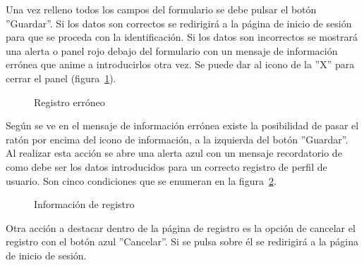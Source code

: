 \documentclass[a4paper, 12pt]{book}
\begin{document}
Una vez relleno todos los campos del formulario se debe pulsar el bot\'on ''Guardar''. Si los datos son correctos se redirigir\'a a la p\'agina de inicio
de sesi\'on para que se proceda con la identificaci\'on. Si los datos son incorrectos se mostrar\'a una alerta o panel rojo debajo del formulario con un 
mensaje de informaci\'on err\'onea que anime a introducirlos otra vez. Se puede dar al icono de la ''X'' para cerrar el panel 
(figura~\ref{figura:registro2}).
\begin{figure}[htbp] 
  \centering
  \caption{Registro err\'oneo}
  \label{figura:registro2}
\end{figure}

Seg\'un se ve en el mensaje de informaci\'on err\'onea existe la posibilidad de pasar el rat\'on por encima del icono de informaci\'on, a la izquierda del 
bot\'on ''Guardar''. Al realizar esta acci\'on se abre una alerta azul con un mensaje recordatorio de como debe ser los datos introducidos para un correcto
registro de perfil de usuario. Son cinco condiciones que se enumeran en la figura~\ref{figura:registro3}.
\begin{figure}[htbp] 
  \centering
  \caption{Informaci\'on de registro}
  \label{figura:registro3}
\end{figure}

Otra acci\'on a destacar dentro de la p\'agina de registro es la opci\'on de cancelar el registro con el bot\'on azul ''Cancelar''. Si se pulsa sobre \'el se
redirigir\'a a la p\'agina de inicio de sesi\'on.
\end{document}
